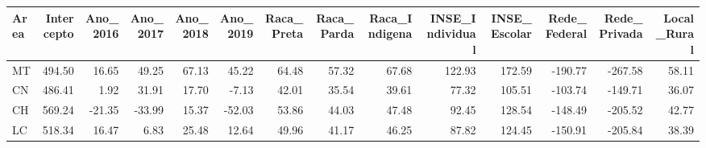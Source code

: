 \begin{tabular}{lrrrrrrrrrrrrr}
\toprule
Area & Intercepto & Ano_2016 & Ano_2017 & Ano_2018 & Ano_2019 & Raca_Preta & Raca_Parda & Raca_Indigena & INSE_Individual & INSE_Escolar & Rede_Federal & Rede_Privada & Local_Rural \\
\midrule
MT & 494.50 & 16.65 & 49.25 & 67.13 & 45.22 & 64.48 & 57.32 & 67.68 & 122.93 & 172.59 & -190.77 & -267.58 & 58.11 \\
CN & 486.41 & 1.92 & 31.91 & 17.70 & -7.13 & 42.01 & 35.54 & 39.61 & 77.32 & 105.51 & -103.74 & -149.71 & 36.07 \\
CH & 569.24 & -21.35 & -33.99 & 15.37 & -52.03 & 53.86 & 44.03 & 47.48 & 92.45 & 128.54 & -148.49 & -205.52 & 42.77 \\
LC & 518.34 & 16.47 & 6.83 & 25.48 & 12.64 & 49.96 & 41.17 & 46.25 & 87.82 & 124.45 & -150.91 & -205.84 & 38.39 \\
\bottomrule
\end{tabular}

